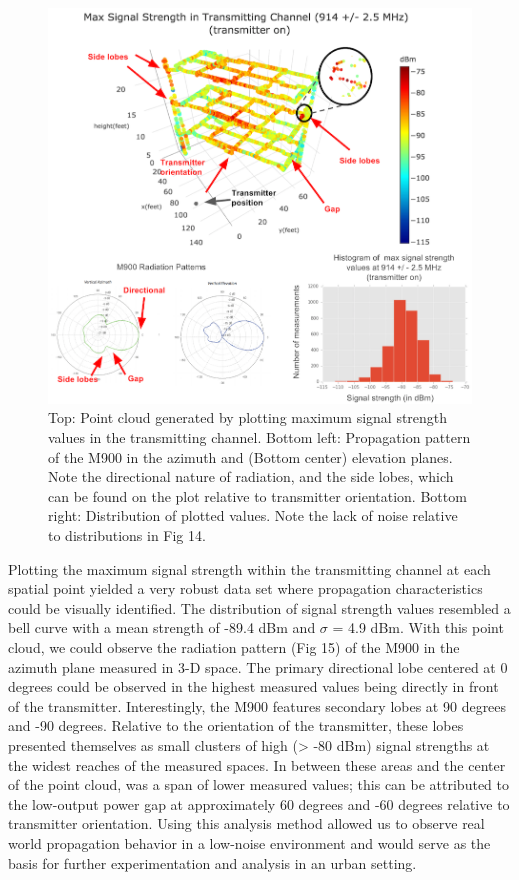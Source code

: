 \documentclass[pageno]{jpaper}
\begin{document}
\begin{figure}
	\caption{Top: Point cloud generated by plotting maximum signal strength values in the transmitting channel. Bottom left: Propagation pattern of the M900 in the azimuth and (Bottom center) elevation planes. Note the directional nature of radiation, and the side lobes, which can be found on the plot relative to transmitter orientation. Bottom right: Distribution of plotted values. Note the lack of noise relative to distributions in Fig 14.  }
	\centerline{\includegraphics{Sexton_2}}
\end{figure}


Plotting the maximum signal strength within the transmitting channel at each spatial point yielded a very robust data set where propagation characteristics could be visually identified. The distribution of signal strength values resembled a bell curve with a mean strength of -89.4 dBm and $\sigma$ = 4.9 dBm. With this point cloud, we could observe the radiation pattern (Fig 15) of the M900 in the azimuth plane measured in 3-D space. The primary directional lobe centered at 0 degrees could be observed in the highest measured values being directly in front of the transmitter. Interestingly, the M900 features secondary lobes at 90 degrees and -90 degrees. Relative to the orientation of the transmitter, these lobes presented themselves as small clusters of high (> -80 dBm) signal strengths at the widest reaches of the measured spaces. In between these areas and the center of the point cloud, was a span of lower measured values; this can be attributed to the low-output power gap at approximately 60 degrees and -60 degrees relative to transmitter orientation. Using this analysis method allowed us to observe real world propagation behavior in a low-noise environment and would serve as the basis for further experimentation and analysis in an urban setting.
\end{document}
